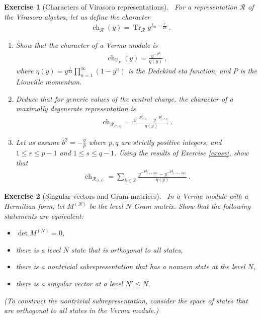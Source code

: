 \documentclass[12pt, a4paper, notitlepage, twoside]{report}
\numberwithin{equation}{section}
\theoremstyle{break}
\newtheorem{exo}{Exercise}[chapter]
\begin{document}
\begin{exo}[Characters of Virasoro representations]
 ~\label{exochar}
For a representation $\mathcal{R}$ of the Virasoro algebra, let us define the character 
\begin{align}
 \operatorname{ch}_\mathcal{R}(y) = \operatorname{Tr}_\mathcal{R} y^{L_0-\frac{c}{24}}\ .
\end{align}
\begin{enumerate}
 \item 
Show that the character of a Verma module is 
\begin{align}
 \operatorname{ch}_{\mathcal{V}_P}(y) = \frac{y^{-P^2}}{\eta(y)}\ ,
\end{align}
where $\eta(y) = y^{\frac{1}{24}}\prod_{n=1}^\infty(1-y^n)$ is the Dedekind eta function, and $P$ is the Liouville momentum. 
\item
Deduce that for generic values of the central charge, the character of a maximally degenerate representation is 
\begin{align}
 \operatorname{ch}_{\mathcal{R}_{\langle r,s\rangle}} = \frac{y^{-P^2_{\langle r,s\rangle}} - y^{-P^2_{\langle -r,s\rangle}}}{\eta(y)}\ .
\end{align}
\item
Let us assume $b^2=-\frac{q}{p}$ where $p,q$ are strictly positive integers, and $1\leq r\leq p-1$ and $1\leq s\leq q-1$. Using the results of Exercise \ref{exosv}, show that 
\begin{align}
 \operatorname{ch}_{\mathcal{R}_{\langle r,s\rangle}} = 
 \sum_{k\in\mathbb{Z}} \frac{y^{-P^2_{\langle r, s+2qk\rangle}} - y^{-P^2_{\langle r, -s+2qk\rangle}}}{\eta(y)}\ .
\end{align}
\end{enumerate}
\end{exo}

\begin{exo}[Singular vectors and Gram matrices]
 ~\label{exodmn}
 In a Verma module with a Hermitian form, let $M^{(N)}$ be the level $N$ Gram matrix. Show that the following statements are equivalent:
 \begin{itemize}
  \item $\det M^{(N)}=0$,
  \item there is a level $N$ state that is orthogonal to all states,
  \item there is a nontrivial subrepresentation that has a nonzero state at the level $N$,
  \item there is a singular vector at a level $N'\leq N$.
 \end{itemize}
(To construct the nontrivial subrepresentation, consider the space of states that are orthogonal to all states in the Verma module.)
\end{exo}
\end{document}
